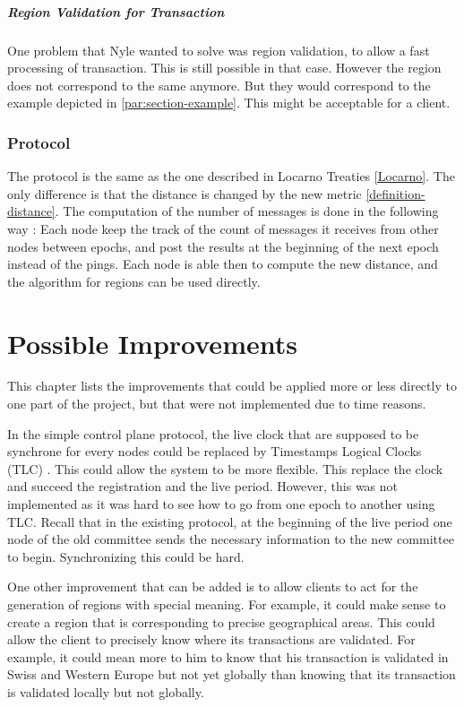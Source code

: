 \documentclass[a4paper,11pt,oneside]{report}
\begin{document}
\paragraph{Region Validation for Transaction}
One problem that Nyle wanted to solve was region validation, to allow a fast
processing of transaction. This is still possible in that case. However the
region does not correspond to the same anymore. But they would correspond to
the example depicted in \autoref{par:section-example}. This might be acceptable
for a client. 

\subsection{Protocol}
The protocol is the same as the one described in Locarno Treaties
\autoref{Locarno}. The only difference is that the distance is changed by the
new metric \autoref{definition-distance}. The computation of the number of
messages is done in the following way : Each node keep the track of the count
of messages it receives from other nodes between epochs, and post the results
at the beginning of the next epoch instead of the pings. Each node is able then
to compute the new distance, and the algorithm for regions can be used
directly.

\chapter{Possible Improvements} \label{chap:Possible Improvements}

This chapter lists the improvements that could be applied more or less directly
to one part of the project, but that were not implemented due to time reasons. 

In the simple control plane protocol, the live clock that are supposed to be
synchrone for every nodes could be replaced by Timestamps Logical Clocks (TLC)
\cite{Ford2019}. This could allow the system to be more flexible.
This replace the clock and succeed the registration and the live period.
However, this was not implemented as it was hard to see how to go from one
epoch to another using TLC. Recall that in the existing protocol, at the
beginning of the live period one node of the old committee sends the necessary
information to the new committee to begin. Synchronizing this could be hard.

One other improvement that can be added is to allow clients to act for the
generation of regions with special meaning. For example, it could make sense to
create a region that is corresponding to precise geographical areas. This could
allow the client to precisely know where its transactions are validated. For
example, it could mean more to him to know that his transaction is validated in
Swiss and Western Europe but not yet globally than knowing that its transaction
is validated locally but not globally. 
\end{document}
